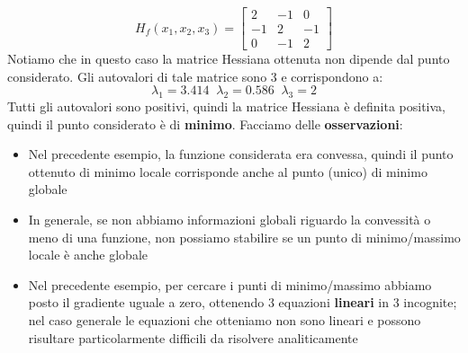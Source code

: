 \documentclass[12pt]{article}
\begin{document}
$$H_f(x_1,x_2,x_3) = \begin{bmatrix}
    2 & -1 & 0 \\
    -1 & 2 & -1 \\
    0 & -1 & 2
\end{bmatrix}$$
Notiamo che in questo caso la matrice Hessiana ottenuta non dipende dal punto considerato.
Gli autovalori di tale matrice sono 3 e corrispondono a:
$$\lambda_1 = 3.414 \; \; \lambda_2 = 0.586 \; \; \lambda_3 = 2$$
Tutti gli autovalori sono positivi, quindi la matrice Hessiana è definita positiva, quindi il punto considerato è di \textbf{minimo}. \newline
Facciamo delle \textbf{osservazioni}:
\begin{itemize}
    \item Nel precedente esempio, la funzione considerata era convessa, quindi il punto ottenuto di minimo locale corrisponde anche al punto (unico) di minimo globale
    \item In generale, se non abbiamo informazioni globali riguardo la convessità o meno di una funzione, non possiamo stabilire se un punto di minimo/massimo locale è anche globale
    \item Nel precedente esempio, per cercare i punti di minimo/massimo abbiamo posto il gradiente uguale a zero, ottenendo 3 equazioni \textbf{lineari} in 3 incognite; nel caso generale le equazioni che otteniamo non sono lineari e possono risultare particolarmente difficili da risolvere analiticamente
\end{itemize}
\end{document}
